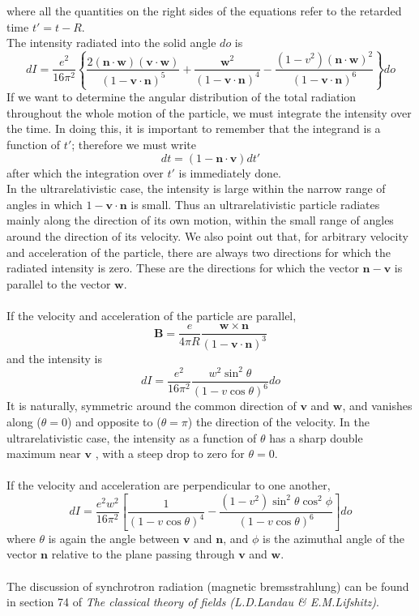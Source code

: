 where all the quantities on the right sides of the equations refer to the retarded time $t' = t - R$. \\
The intensity radiated into the solid angle $do$ is
\[dI = \frac{e^2}{16\pi^2} \left\{ \frac{2(\bm{n}\cdot\bm{w})(\bm{v}\cdot\bm{w})}{(1-\bm{v}\cdot\bm{n})^5} + \frac{\bm{w}^2}{(1-\bm{v}\cdot\bm{n})^4} - \frac{(1-v^2)(\bm{n}\cdot\bm{w})^2}{(1-\bm{v}\cdot\bm{n})^6}\right\}do\]
If we want to determine the angular distribution of the total radiation throughout the whole motion of the particle, we must integrate the intensity over the time. In doing this, it
is important to remember that the integrand is a function of $t'$; therefore we must write
\[dt = (1-\bm{n}\cdot\bm{v})dt'\]
after which the integration over $t'$ is immediately done.\\
In the ultrarelativistic case, the intensity is large within the narrow range of angles in which $1-\bm{v}\cdot\bm{n}$ is small. Thus an ultrarelativistic particle radiates mainly along the direction of its own motion, within the small range  of angles around the direction of its velocity. We also point out that, for arbitrary velocity and acceleration of the particle, there are always two directions for which the radiated intensity is zero. These are the directions for
which the vector $\bm{n}-\bm{v}$ is parallel to the vector $\bm{w}$.\\ \\
If the velocity and acceleration of the particle are parallel,
\[\bm{B} = \frac{e}{4\pi R} \frac{\bm{w} \times \bm{n}}{(1-\bm{v}\cdot\bm{n})^3}\]
and the intensity is
\[dI = \frac{e^2}{16\pi^2} \frac{w^2 \sin^2 \theta}{(1-v\cos\theta)^6} do\]
It is naturally, symmetric around the common direction of $\bm{v}$ and $\bm{w}$, and vanishes along ($\theta=0$) and opposite to ($\theta = \pi$) the direction of the velocity. In the ultrarelativistic case, the intensity as a function of $\theta$ has a sharp double maximum near $\bm{v}$ , with a steep drop to zero for $\theta = 0$.
\\ \\
If the velocity and acceleration are perpendicular to one another,
\[dI = \frac{e^2 w^2}{16\pi^2} \left[ \frac{1}{(1-v\cos\theta)^4} - \frac{(1-v^2)\sin^2\theta \cos^2\phi}{(1-v\cos\theta)^6} \right]do\]
where $\theta$ is again the angle between $\bm{v}$ and $\bm{n}$, and $\phi$ is the azimuthal angle of the vector $\bm{n}$ relative to the plane passing through $\bm{v}$ and $\bm{w}$.\\ \\
The discussion of synchrotron radiation (magnetic bremsstrahlung) can be found in section 74 of \emph{The classical theory of fields (L.D.Landau \& E.M.Lifshitz)}.

